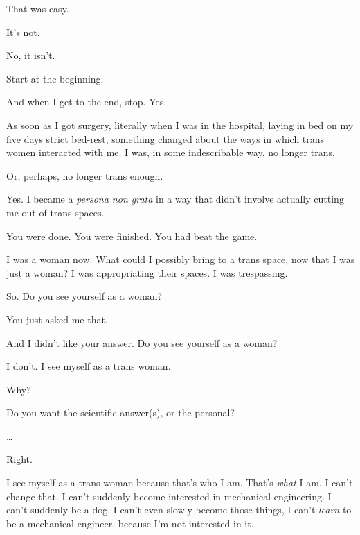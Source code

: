 \begin{paracol}{2}
\begin{leftcolumn}
\begin{ally}
That was easy.
\end{ally}
It's not.

\begin{ally}
No, it isn't.
\end{ally}
\newpage

\begin{ally}
Start at the beginning.
\end{ally}
And when I get to the end, stop. Yes.

As soon as I got surgery, literally when I was in the hospital, laying in bed on my five days strict bed-rest, something changed about the ways in which trans women interacted with me. I was, in some indescribable way, no longer trans.

\begin{ally}
Or, perhaps, no longer trans enough.
\end{ally}
Yes. I became a \emph{persona non grata} in a way that didn't involve actually cutting me out of trans spaces.

\begin{ally}
You were done. You were finished. You had beat the game.
\end{ally}
I was a woman now. What could I possibly bring to a trans space, now that I was just a woman? I was appropriating their spaces. I was trespassing.

\begin{ally}
So. Do you see yourself as a woman?
\end{ally}
You just asked me that.

\begin{ally}
And I didn't like your answer. Do you see yourself as a woman?
\end{ally}
I don't. I see myself as a trans woman.

\begin{ally}
Why?
\end{ally}
Do you want the scientific answer(s), or the personal?

\begin{ally}
\ldots{}
\end{ally}
Right.

I see myself as a trans woman because that's who I am. That's \emph{what} I am. I can't change that. I can't suddenly become interested in mechanical engineering. I can't suddenly be a dog. I can't even slowly become those things, I can't \emph{learn} to be a mechanical engineer, because I'm not interested in it.


\end{leftcolumn}
\end{paracol}
